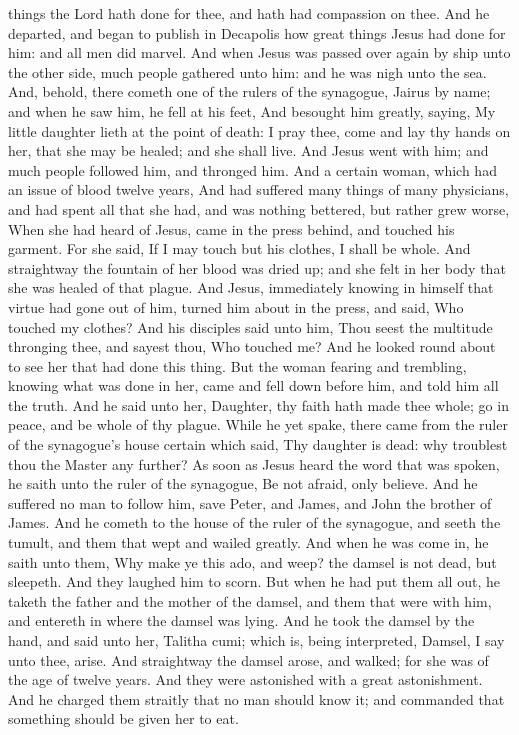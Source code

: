things the Lord hath done for thee, and hath had compassion on thee.
 And he departed, and began to publish in Decapolis how
great things Jesus had done for him: and all men did marvel.
 And when Jesus was passed over again by ship unto the
other side, much people gathered unto him: and he was nigh unto the sea.
 And, behold, there cometh one of the rulers of the
synagogue, Jairus by name; and when he saw him, he fell at his feet,
 And besought him greatly, saying, My little daughter
lieth at the point of death: I pray thee, come and lay thy hands on her,
that she may be healed; and she shall live.  And Jesus
went with him; and much people followed him, and thronged him.
 And a certain woman, which had an issue of blood twelve
years,  And had suffered many things of many physicians,
and had spent all that she had, and was nothing bettered, but rather
grew worse,  When she had heard of Jesus, came in the
press behind, and touched his garment.  For she said, If
I may touch but his clothes, I shall be whole.  And
straightway the fountain of her blood was dried up; and she felt in her
body that she was healed of that plague.  And Jesus,
immediately knowing in himself that virtue had gone out of him, turned
him about in the press, and said, Who touched my clothes?
 And his disciples said unto him, Thou seest the
multitude thronging thee, and sayest thou, Who touched me?
 And he looked round about to see her that had done this
thing.  But the woman fearing and trembling, knowing what
was done in her, came and fell down before him, and told him all the
truth.  And he said unto her, Daughter, thy faith hath
made thee whole; go in peace, and be whole of thy plague.
 While he yet spake, there came from the ruler of the
synagogue's house certain which said, Thy daughter is dead: why
troublest thou the Master any further?  As soon as Jesus
heard the word that was spoken, he saith unto the ruler of the
synagogue, Be not afraid, only believe.  And he suffered
no man to follow him, save Peter, and James, and John the brother of
James.  And he cometh to the house of the ruler of the
synagogue, and seeth the tumult, and them that wept and wailed greatly.
 And when he was come in, he saith unto them, Why make ye
this ado, and weep? the damsel is not dead, but sleepeth.
 And they laughed him to scorn. But when he had put them
all out, he taketh the father and the mother of the damsel, and them
that were with him, and entereth in where the damsel was lying.
 And he took the damsel by the hand, and said unto her,
Talitha cumi; which is, being interpreted, Damsel, I say unto thee,
arise.  And straightway the damsel arose, and walked; for
she was of the age of twelve years. And they were astonished with a
great astonishment.  And he charged them straitly that no
man should know it; and commanded that something should be given her to
eat.

